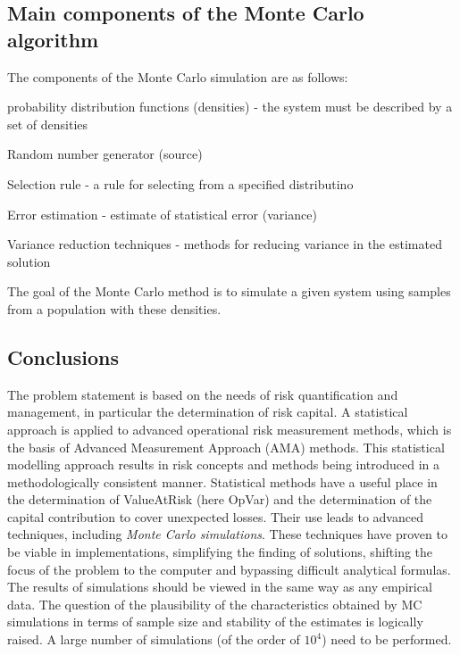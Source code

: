 \documentclass{article}
\begin{document}
\subsection{Main components of the Monte Carlo algorithm}

The components of the Monte Carlo simulation are as follows:

\begin{compactitem}

\item probability distribution functions (densities) - the system must be described by a set of densities
\item Random number generator (source)
\item Selection rule - a rule for selecting from a specified distributino
\item Error estimation - estimate of statistical error (variance)
\item Variance reduction techniques - methods for reducing variance in the estimated solution

\end{compactitem}

The goal of the Monte Carlo method is to simulate a given system using samples from a population with these densities.

\subsection{Conclusions}

The problem statement is based on the needs of risk quantification and management, in particular the determination of risk capital. A statistical approach is applied to advanced operational risk measurement methods, which is the basis of Advanced Measurement Approach (AMA) methods. This statistical modelling approach results in risk concepts and methods being introduced in a methodologically consistent manner. Statistical methods have a useful place in the determination of ValueAtRisk (here OpVar) and the determination of the capital contribution to cover unexpected losses. Their use leads to advanced techniques, including \emph{Monte Carlo simulations}. These techniques have proven to be viable in implementations, simplifying the finding of solutions, shifting the focus of the problem to the computer and bypassing difficult analytical formulas. The results of simulations should be viewed in the same way as any empirical data. The question of the plausibility of the characteristics obtained by MC simulations in terms of sample size and stability of the estimates is logically raised. A large number of simulations (of the order of $10^4$) need to be performed.
\end{document}
